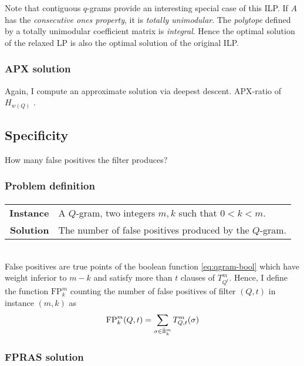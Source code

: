 Note that contiguous $q$-grams provide an interesting special case of this ILP.
If $A$ has the \emph{consecutive ones property}, it is \emph{totally unimodular}.
The \emph{polytope} defined by a totally unimodular coefficient matrix is \emph{integral}.
Hence the optimal solution of the relaxed LP is also the optimal solution of the original ILP.


\subsubsection{APX solution}

Again, I compute an approximate solution via deepest descent.
APX-ratio of $H_{w(Q)}$ \citep{Vazirani2001}.


\subsection{Specificity}

How many false positives the filter produces?

\subsubsection{Problem definition}

\paragraph{}
\begin{tabular}{rl}
{\bf Instance}	&	A $Q$-gram, two integers $m,k$ such that $0 < k < m$.\\
{\bf Solution}	&	The number of false positives produced by the $Q$-gram.\\
\end{tabular}
\\

False positives are true points of the boolean function \ref{eq:qgram-bool} which have weight inferior to $m-k$ and satisfy more than $t$ clauses of $T_{Q^t}^{m}$.
Hence, I define the function $\text{FP}_{k}^{m}$ counting the number of false positives of filter $(Q,t)$ in instance $(m,k)$ as
\begin{equation}
\text{FP}_{k}^{m}(Q,t) = \sum_{\sigma \in {\bar{\ensuremath{\mathbb {B}}}^{m}_{k}}} T_{Q,t}^{m}(\sigma)
\end{equation}

\subsubsection{FPRAS solution}

